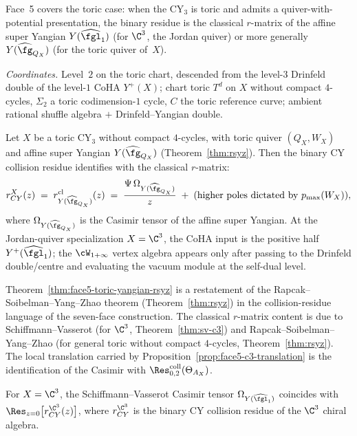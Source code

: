 Face~5 covers the toric case: when the CY$_3$ is toric
and admits a quiver-with-potential presentation, the binary residue
is the classical $r$-matrix of the affine super Yangian
$Y(\widehat{\fgl}_1)$ \textup{(}for $\C^3$, the Jordan quiver\textup{)}
or more generally $Y(\widehat{\fg}_{Q_X})$ \textup{(}for the toric
quiver of~$X$\textup{)}.

\smallskip
\noindent\emph{Coordinates.} Level~$2$ on the toric chart, descended
from the level-$3$ Drinfeld double of the level-$1$ CoHA $Y^+(X)$;
chart toric $T^d$ on $X$ without compact $4$-cycles, $\Sigma_2$ a
toric codimension-$1$ cycle, $C$ the toric reference curve;
ambient rational shuffle algebra $+$ Drinfeld--Yangian double.

\begin{theorem}
\label{thm:face5-toric-yangian-rsyz}
Let $X$ be a toric CY$_3$ without compact $4$-cycles, with toric quiver
$(Q_X, W_X)$ and affine super Yangian $Y(\widehat{\fg}_{Q_X})$
(Theorem~\ref{thm:rsyz}). Then the binary CY collision residue
identifies with the classical $r$-matrix:
\[
 r_{CY}^{X}(z) \;=\; r_{Y(\widehat{\fg}_{Q_X})}^{\mathrm{cl}}(z)
 \;=\; \frac{\Psi\,\Omega_{Y(\widehat{\fg}_{Q_X})}}{z}
 \;+\; (\text{higher poles dictated by } p_{\max}(W_X)),
\]
where $\Omega_{Y(\widehat{\fg}_{Q_X})}$ is the Casimir tensor of the
affine super Yangian. At the Jordan-quiver specialization $X = \C^3$,
the CoHA input is the positive half
$Y^+(\widehat{\fgl}_1)$; the $\cW_{1+\infty}$ vertex algebra appears only
after passing to the Drinfeld double/centre and evaluating the vacuum
module at the self-dual level.
\end{theorem}

\begin{remark}
\label{rem:face5-proof-support}
Theorem~\ref{thm:face5-toric-yangian-rsyz} is a restatement of the
Rapcak--Soibelman--Yang--Zhao theorem (Theorem~\ref{thm:rsyz}) in the
collision-residue language of the seven-face construction. The classical
$r$-matrix content is due to Schiffmann--Vasserot (for $\C^3$,
Theorem~\ref{thm:sv-c3}) and Rapcak--Soibelman--Yang--Zhao (for general
toric without compact $4$-cycles, Theorem~\ref{thm:rsyz}). The local
translation carried by Proposition~\ref{prop:face5-c3-translation} is
the identification of the Casimir with
$\Res^{\mathrm{coll}}_{0,2}(\Theta_{A_X})$.
\end{remark}

\begin{proposition}
\label{prop:face5-c3-translation}
For $X = \C^3$, the Schiffmann--Vasserot Casimir tensor
$\Omega_{Y(\widehat{\fgl}_1)}$ coincides with
$\Res_{z=0}\bigl[r_{CY}^{\C^3}(z)\bigr]$, where $r_{CY}^{\C^3}$ is the
binary CY collision residue of the $\C^3$ chiral algebra.
\end{proposition}

